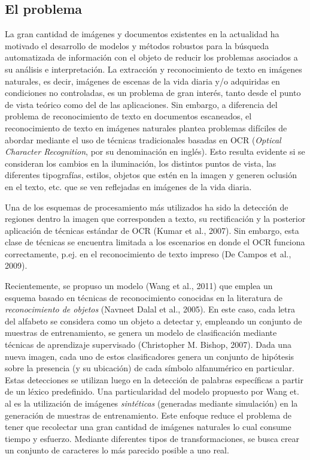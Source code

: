 \subsection{El problema}

	La gran cantidad de imágenes y documentos existentes en la actualidad ha motivado el desarrollo de modelos y métodos robustos para la búsqueda automatizada de información con el objeto de reducir los problemas asociados a su análisis e interpretación. La extracción y reconocimiento de texto en imágenes naturales, es decir, imágenes de escenas de la vida diaria y/o adquiridas en condiciones no controladas, es un problema de gran interés, tanto desde el punto de vista teórico como del de las aplicaciones.  Sin embargo, a diferencia del problema de reconocimiento de texto en documentos escaneados, el reconocimiento de texto en imágenes naturales plantea problemas difíciles de abordar mediante el uso de técnicas tradicionales basadas en OCR (\textit{Optical Character Recognition}, por su denominación en inglés). Esto resulta evidente si se consideran los cambios en la iluminación, los distintos puntos de vista, las diferentes tipografías, estilos, objetos que estén en la imagen y generen oclusión en el texto, etc. que se ven reflejadas en imágenes de la vida diaria.

	Una de los esquemas de procesamiento más utilizados ha sido la detección de regiones dentro la imagen que corresponden a texto, su rectificación y la posterior aplicación de técnicas estándar de OCR (Kumar et al., 2007). Sin embargo, esta clase de técnicas se encuentra limitada a los escenarios en donde el OCR funciona correctamente, p.ej. en el reconocimiento de texto impreso (De Campos et al., 2009).

	Recientemente, se propuso un modelo (Wang et al., 2011) que emplea un esquema basado en técnicas de reconocimiento conocidas en la literatura de \textit{reconocimiento de objetos} (Navneet Dalal et al., 2005). En este caso, cada letra del alfabeto se considera como un objeto a detectar y, empleando un conjunto de muestras de entrenamiento, se genera un modelo de clasificación mediante técnicas de aprendizaje supervisado (Christopher M. Bishop, 2007). Dada una nueva imagen, cada uno de estos clasificadores genera un conjunto de hipótesis sobre la presencia (y su ubicación) de cada símbolo alfanumérico en particular. Estas detecciones se utilizan luego en la detección de palabras específicas a partir de un léxico predefinido. Una particularidad del modelo propuesto por Wang et. al es la utilización de imágenes \textit{sintéticas} (generadas mediante simulación) en la generación de muestras de entrenamiento. Este enfoque reduce el problema de tener que recolectar una gran cantidad de imágenes naturales lo cual consume tiempo y esfuerzo. Mediante diferentes tipos de transformaciones, se busca crear un conjunto de caracteres lo más parecido posible a uno real.
	